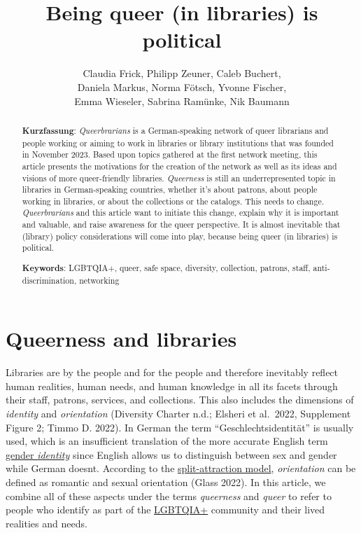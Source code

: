 \documentclass[a4paper,
fontsize=11pt,
oneside,
numbers=noperiodatend,
parskip=half-,
bibliography=totoc,
final
]{scrartcl}
\title{\LARGE{Being queer (in libraries) is political}}%
\author{Claudia Frick, Philipp Zeuner, Caleb Buchert,\\ Daniela Markus, Norma Fötsch, Yvonne Fischer,\\ Emma Wieseler, Sabrina Ramünke, Nik Baumann} %
\date{}
\begin{document}
\maketitle
\thispagestyle{fancyplain} 

\begin{abstract}
\noindent
\textbf{Kurzfassung}: \textit{Queerbrarians} is a German-speaking network of
queer librarians and people working or aiming to work in libraries or
library institutions that was founded in November 2023. Based upon
topics gathered at the first network meeting, this article presents the
motivations for the creation of the network as well as its ideas and
visions of more queer-friendly libraries. \textit{Queerness} is still an
underrepresented topic in libraries in German-speaking countries,
whether it's about patrons, about people working in libraries, or about
the collections or the catalogs. This needs to change. \textit{Queerbrarians} and
this article want to initiate this change, explain why it is important
and valuable, and raise awareness for the queer perspective. It is
almost inevitable that (library) policy considerations will come into
play, because being queer (in libraries) is political.
\end{abstract}

\begin{abstract}
\noindent
\textbf{Keywords}: LGBTQIA+, queer, safe space, diversity, collection, patrons, staff, anti-discrimination, networking
\end{abstract}

\hypertarget{queerness-and-libraries}{%
\section{Queerness and libraries}\label{queerness-and-libraries}}

Libraries are by the people and for the people and therefore inevitably
reflect human realities, human needs, and human knowledge in all its
facets through their staff, patrons, services, and collections. This
also includes the dimensions of \emph{identity} and \emph{orientation}
(Diversity Charter n.d.; Elsheri et al.~2022, Supplement Figure 2; Timmo
D. 2022). In German the term
\enquote{Geschlechtsidentität} is usually used,
which is an insufficient translation of the more accurate English term
\href{https://lgbtqia.fandom.com/wiki/Gender\_identity}{gender \textit{identity}}
since English allows us to distinguish between sex and gender while
German doesn\textquotesingle t. According to the
\href{https://lgbtqia.mywikis.wiki/wiki/Split_Attraction_Model}{split-attraction
model}, \emph{orientation} can be defined as romantic and sexual
orientation (Glass 2022). In this article, we combine all of these
aspects under the terms \emph{queerness} and \emph{queer} to refer to
people who identify as part of the
\href{https://lgbtqia.mywikis.wiki/wiki/LGBT}{LGBTQIA+} community and
their lived realities and needs.
\end{document}
